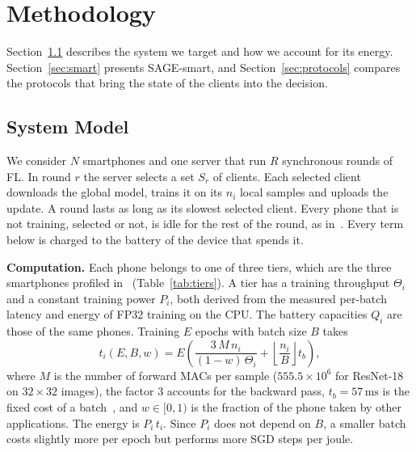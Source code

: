 \section{Methodology}
\label{sec:methodology}

Section~\ref{sec:system} describes the system we target and how we account
for its energy. Section~\ref{sec:smart} presents SAGE-smart, and
Section~\ref{sec:protocols} compares the protocols that bring the state of the
clients into the decision.

\subsection{System Model}\label{sec:system}

We consider $N$ smartphones and one server that run $R$ synchronous rounds of
FL. In round $r$ the server selects a set $S_r$ of clients. Each selected
client downloads the global model, trains it on its $n_i$ local samples and
uploads the update. A round lasts as long as its slowest selected client.
Every phone that is not training, selected or not, is idle for the rest of the
round, as in~\cite{maciel2024escs}. Every term below is charged to the battery
of the device that spends it.

\textbf{Computation.}
Each phone belongs to one of three tiers, which are the three smartphones
profiled in~\cite{xu2022mandheling} (Table~\ref{tab:tiers}). A tier has a
training throughput $\Theta_i$ and a constant training power $P_i$, both
derived from the measured per-batch latency and energy of FP32 training on the
CPU. The battery capacities $Q_i$ are those of the same phones. Training $E$
epochs with batch size $B$ takes
\begin{equation}
  t_i(E,B,w) = E\left(\frac{3\,M\,n_i}{(1-w)\,\Theta_i}
             + \left\lfloor\frac{n_i}{B}\right\rfloor t_b\right),
  \label{eq:ttrain}
\end{equation}
where $M$ is the number of forward MACs per sample ($555.5\times10^{6}$ for
ResNet-18 on $32\times32$ images), the factor 3 accounts for the backward pass,
$t_b=57\,\mathrm{ms}$ is the fixed cost of a batch~\cite{xu2022mandheling}, and
$w\in[0,1)$ is the fraction of the phone taken by other applications. The
energy is $P_i\,t_i$. Since $P_i$ does not depend on $B$, a smaller batch costs
slightly more per epoch but performs more SGD steps per joule.

